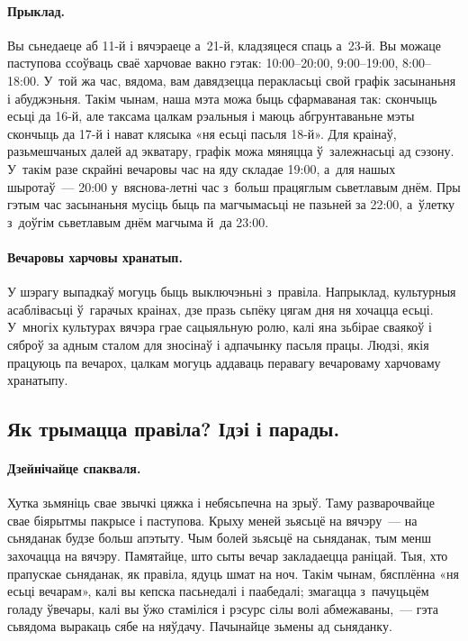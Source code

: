 \paragraph{Прыклад.}
Вы сьнедаеце аб 11-й і вячэраеце а~21-й, кладзяцеся спаць а~23-й. Вы можаце паступова ссоўваць сваё харчовае вакно гэтак: 10:00–20:00, 9:00–19:00, 8:00–18:00. У~той жа час, вядома, вам давядзецца перакласьці свой графік засынаньня і абуджэньня.
Такім чынам, наша мэта можа быць сфармаваная так: скончыць есьці да 16-й, але таксама цалкам рэальныя і маюць абгрунтаваньне мэты скончыць да 17-й і нават клясыка «ня есьці пасьля 18-й». Для краінаў, разьмешчаных далей ад экватару, графік можа мяняцца ў~залежнасьці ад сэзону. У~такім разе скрайні вечаровы час на яду складае 19:00, а~для нашых шыротаў~--- 20:00 у~вяснова-летні час з~больш працяглым сьветлавым днём. Пры гэтым час засынаньня мусіць быць па магчымасьці не пазьней за 22:00, а~ўлетку з~доўгім сьветлавым днём магчыма й~да 23:00.

\paragraph{Вечаровы харчовы хранатып.}
У шэрагу выпадкаў могуць быць выключэньні з~правіла. Напрыклад, культурныя асаблівасьці ў~гарачых краінах, дзе празь сьпёку цягам дня ня хочацца есьці. У~многіх культурах вячэра грае сацыяльную ролю, калі яна зьбірае сваякоў і сяброў за адным сталом для зносінаў і адпачынку пасьля працы. Людзі, якія працуюць па вечарох, цалкам могуць аддаваць перавагу вечароваму харчоваму хранатыпу.

\subsection{Як трымацца правіла? Ідэі і парады.}

\paragraph{Дзейнічайце спакваля.}
Хутка зьмяніць свае звычкі цяжка і небясьпечна на зрыў. Таму разварочвайце свае біярытмы пакрысе і паступова. Крыху меней зьясьцё на вячэру~--- на сьняданак будзе больш апэтыту. Чым болей зьясьцё на сьняданак, тым менш захочацца на вячэру. Памятайце, што сыты вечар закладаецца раніцай. Тыя, хто прапускае сьняданак, як правіла, ядуць шмат на ноч. Такім чынам, бясплённа «ня есьці вечарам», калі вы кепска пасьнедалі і паабедалі; змагацца з~пачуцьцём голаду ўвечары, калі вы ўжо стаміліся і рэсурс сілы волі абмежаваны,~--- гэта сьвядома выракаць сябе на няўдачу. Пачынайце зьмены ад сьняданку.

